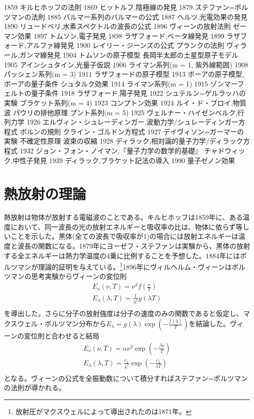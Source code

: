 
1859 キルヒホッフの法則
1869 ヒットルフ,陰極線の発見
1879 ステファン=ボルツマンの法則
1885 バルマー系列のバルマーの公式
1887 ヘルツ,光電効果の発見
1890 リュードベリ,水素スペクトルの波長の公式
1896 ヴィーンの放射法則
	 ゼーマン効果
1897 トムソン,電子発見
1898 ラザフォード,ベータ線発見
1899 ラザフォード,アルファ線発見
1900 レイリー・ジーンズの公式
	 プランクの法則
	 ヴィラール,ガンマ線発見
1904 トムソンの原子模型
	 長岡半太郎の土星型原子モデル
1905 アインシュタイン,光量子仮説
1906 ライマン系列(m = 1, 紫外線範囲)
1908 パッシェン系列(m = 3)
1911 ラザフォードの原子模型
1913 ボーアの原子模型,ボーアの量子条件
	 シュタルク効果
1914 ライマン系列(m = 1)
1915 ゾンマーフェルトの量子条件
1918 ラザフォード,陽子発見
1922 シュテルン=ゲルラッハの実験
	 ブラケット系列(m = 4)
1923 コンプトン効果
1924 ルイ・ド・ブロイ,物質波
	 パウリの排他原理
	 プント系列(m = 5)
1925 ヴェルナー・ハイゼンベルク,行列力学
1926 エルヴィン・シュレーディンガー,波動力学/シュレーディンガー方程式
	 ボルンの規則
	 クライン・ゴルドン方程式
1927 デイヴィソン=ガーマーの実験
	 不確定性原理
	 波束の収縮
1928 ディラック,相対論的量子力学/ディラック方程式
1932 ジョン・フォン・ノイマン,『量子力学の数学的基礎』
	 チャドウィック,中性子発見
1939 ディラック,ブラケット記法の導入
1990 量子ゼノン効果
\section{熱放射の理論}
	熱放射は物体が放射する電磁波のことである。キルヒホッフは1859年に、ある温度において、同一波長の光の放射エネルギーと吸収率の比は、物体に依らず等しいことを示した。黒体(全ての波長で吸収率が1)の場合には放射エネルギーは温度と波長の関数になる。1879年にヨーゼフ・ステファンは実験から、黒体の放射する全エネルギーは熱力学温度の4乗に比例することを予想した。1884年にはボルツマンが理論的証明を与えている。\footnote{放射圧がマクスウェルによって導出されたのは1871年。}1896年にヴィルヘルム・ヴィーンはボルツマンの思考実験からヴィーンの変位則
	\begin{gather*}
		E_\nu(\nu, T) = \nu^3f(\frac{\nu}{T})\\
		E_\lambda(\lambda, T) = \frac{1}{\lambda^5}g(\lambda T)\\
	\end{gather*}
	を導出した。さらに分子の放射強度は分子の速度のみの関数であると仮定し、マクスウェル・ボルツマン分布から$E_\lambda = g(\lambda)\exp(-\frac{f(\lambda)}{T})$を結論した。ヴィーンの変位則と合わせると結局
	\begin{gather*}
		E_\nu(\nu, T) = \alpha\nu^3\exp(-\frac{\beta\nu}{T})\\
		E_\lambda(\lambda, T) = \frac{c_1}{\lambda^5}\exp(-\frac{c_2}{\lambda T})\\
	\end{gather*}
	となる。ヴィーンの公式を全振動数について積分すればステファン=ボルツマンの法則が導かれる。
	
